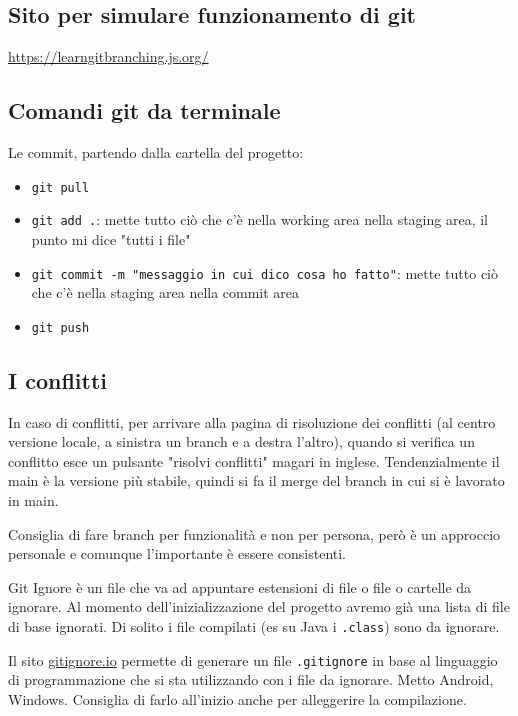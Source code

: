 \subsection{Sito per simulare funzionamento di git}
\url{https://learngitbranching.js.org/}

\subsection{Comandi git da terminale}
\par Le commit, partendo dalla cartella del progetto:
\begin{itemize}
    \item \texttt{git pull}
    \item \texttt{git add .}: mette tutto ciò che c'è nella working area nella staging area, il punto mi dice "tutti i file"
    \item \texttt{git commit -m "messaggio in cui dico cosa ho fatto"}: mette tutto ciò che c'è nella staging area nella commit area
    \item \texttt{git push}
\end{itemize}
\par 

\subsection{I conflitti}
\par In caso di conflitti, per arrivare alla pagina di risoluzione dei conflitti (al centro versione locale, a sinistra un branch e a destra l'altro), quando si verifica un conflitto esce un pulsante "risolvi conflitti" magari in inglese. Tendenzialmente il main è la versione più stabile, quindi si fa il merge del branch in cui si è lavorato in main.
\par Consiglia di fare branch per funzionalità e non per persona, però è un approccio personale e comunque l'importante è essere consistenti.


\par Git Ignore è un file che va ad appuntare estensioni di file o file o cartelle da ignorare. Al momento dell'inizializzazione del progetto avremo già una lista di file di base ignorati. Di solito i file compilati (es su Java i \texttt{.class}) sono da ignorare.
\par Il sito \url{gitignore.io} permette di generare un file \texttt{.gitignore} in base al linguaggio di programmazione che si sta utilizzando con i file da ignorare. Metto Android, Windows. Consiglia di farlo all'inizio anche per alleggerire la compilazione.

